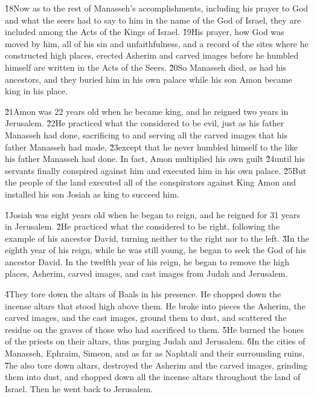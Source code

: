 \v{18}Now as to the rest of Manasseh's accomplishments, including his prayer to God and what the seers had to say to him in the name of the  God of Israel, they are included among the Acts of the Kings of Israel. \v{19}His prayer, how God was moved by him, all of his sin and unfaithfulness, and a record of the sites where he constructed high places, erected Asherim and carved images before he humbled himself are written in the Acts of the Seers. \v{20}So Manasseh died, as had his ancestors, and they buried him in his own palace while his son Amon became king in his place.

\v{21}Amon was 22 years old when he became king, and he reigned two years in Jerusalem. \v{22}He practiced what the  considered to be evil, just as his father Manasseh had done, sacrificing to and serving all the carved images that his father Manasseh had made, \v{23}except that he never humbled himself to the  like his father Manasseh had done. In fact, Amon multiplied his own guilt \v{24}until his servants finally conspired against him and executed him in his own palace. \v{25}But the people of the land executed all of the conspirators against King Amon and installed his son Josiah as king to succeed him.

\v{1}Josiah was eight years old when he began to reign, and he reigned for 31 years in Jerusalem. \v{2}He practiced what the  considered to be right, following the example of his ancestor David, turning neither to the right nor to the left. \v{3}In the eighth year of his reign, while he was still young, he began to seek the God of his ancestor David. In the twelfth year of his reign, he began to remove the high places, Asherim, carved images, and cast images from Judah and Jerusalem.

\v{4}They tore down the altars of Baals in his presence. He chopped down the incense altars that stood high above them. He broke into pieces the Asherim, the carved images, and the cast images, ground them to dust, and scattered the residue on the graves of those who had sacrificed to them. \v{5}He burned the bones of the priests on their altars, thus purging Judah and Jerusalem. \v{6}In the cities of Manasseh, Ephraim, Simeon, and as far as Naphtali and their surrounding ruins, \v{7}he also tore down altars, destroyed the Asherim and the carved images, grinding them into dust, and chopped down all the incense altars throughout the land of Israel. Then he went back to Jerusalem.

